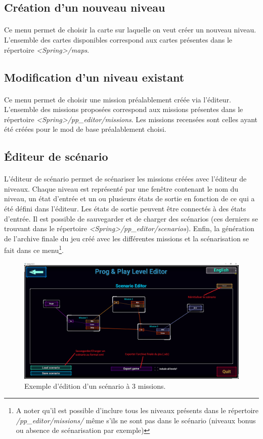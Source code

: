 \documentclass[a4paper]{article}
\begin{document}
\subsection{Création d'un nouveau niveau}
\paragraph{ }
Ce menu permet de choisir la carte sur laquelle on veut créer un nouveau niveau. L'ensemble des cartes disponibles correspond aux cartes présentes dans le répertoire \textit{<Spring>/maps}.
\subsection{Modification d'un niveau existant}
\paragraph{ }
Ce menu permet de choisir une mission préalablement créée via l'éditeur. L'ensemble des missions proposées correspond aux missions présentes dans le répertoire \textit{<Spring>/pp\_editor/missions}. Les missions recensées sont celles ayant été créées pour le mod de base préalablement choisi.
\subsection{Éditeur de scénario}
\paragraph{ }
L'éditeur de scénario permet de scénariser les missions créées avec l'éditeur de niveaux. Chaque niveau est représenté par une fenêtre contenant le nom du niveau, un état d'entrée et un ou plusieurs états de sortie en fonction de ce qui a été défini dans l'éditeur. Les états de sortie peuvent être connectés à des états d'entrée. Il est possible de sauvegarder et de charger des scénarios (ces derniers se trouvant dans le répertoire \textit{<Spring>/pp\_editor/scenarios}). Enfin, la génération de l'archive finale du jeu créé avec les différentes missions et la scénarisation se fait dans ce menu\footnote{A noter qu'il est possible d'inclure tous les niveaux présents dans le répertoire \textit{/pp\_editor/missions/} même s'ils ne sont pas dans le scénario (niveaux bonus ou absence de scénarisation par exemple)}.
\begin{figure}[H]
\centering
\includegraphics[width=\linewidth]{launcher-scenario.png}
\caption{Exemple d'édition d'un scénario à 3 missions.}
\label{fig:launcher-scenario}
\end{figure}
\end{document}
